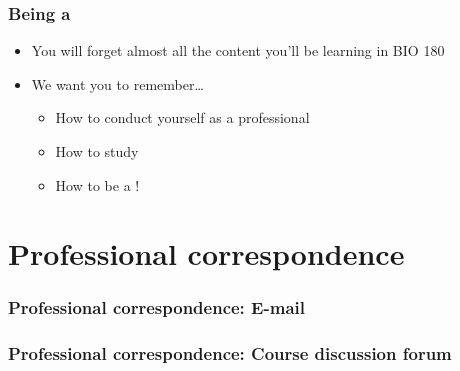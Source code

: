 \begin{noheadline}
\begin{frame}
    \frametitle{Being a }
    \begin{itemize}[<+->]
        \item You will forget almost all the content you'll be learning in BIO 180
        \item We want you to remember\ldots
            \begin{itemize}
                \item How to conduct yourself as a professional
                \item How to study
                \item How to be a !
            \end{itemize}
    \end{itemize}
\end{frame}
\end{noheadline}

\section{Professional correspondence}

\begin{noheadline}
\begin{frame}
    \frametitle{Professional correspondence: E-mail}





\end{frame}
\end{noheadline}

\begin{noheadline}
\begin{frame}
    \frametitle{Professional correspondence: Course discussion forum}

\end{frame}
\end{noheadline}


